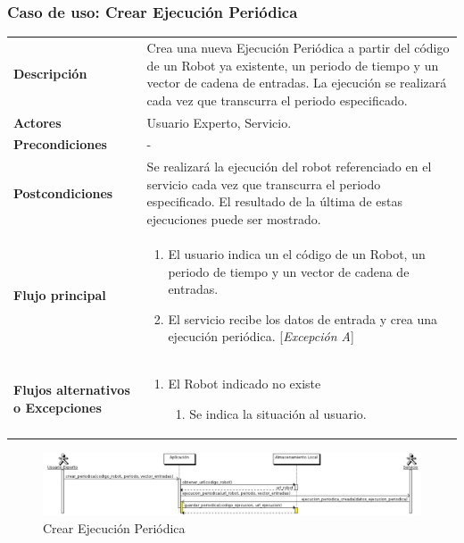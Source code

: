 \subsubsection{\large{Caso de uso: Crear Ejecución Periódica}}

\begin{tabular}[h]{ p{ } p{ }}

\textbf{Descripción} & Crea una nueva Ejecución Periódica a partir del
código de un Robot ya existente, un periodo de tiempo y un vector de
cadena de entradas.  La ejecución se realizará cada vez que transcurra
el periodo especificado.\\[3mm]

\textbf{Actores} & Usuario Experto, Servicio.\\[3mm]

\textbf{Precondiciones} & - \\[3mm]

\textbf{Postcondiciones} & Se realizará la ejecución del robot
referenciado en el servicio cada vez que transcurra el periodo
especificado. El resultado de la última de estas ejecuciones puede ser
mostrado. \\[3mm]

\textbf{Flujo principal} & \begin{enumerate}[leftmargin=1em,topsep=0pt, partopsep=0pt]
  \item El usuario indica un el código de un Robot, un periodo de
    tiempo y un vector de cadena de entradas.
  \item El servicio recibe los datos de entrada y crea una ejecución
    periódica. [\emph{Excepción A}]
\end{enumerate}\\[3mm]

\textbf{Flujos alternativos o Excepciones} &
\begin{enumerate}[label=\Alph*:,leftmargin=1em,topsep=0pt, partopsep=0pt]
\item El Robot indicado no existe
  \begin{enumerate}[label=\arabic*.,topsep=0pt, partopsep=0pt]
    \item Se indica la situación al usuario.
  \end{enumerate}
\end{enumerate}\\[3mm]
\end{tabular}

\begin{figure}[bp!]
  \includegraphics[width=1\textwidth]{chapters/technical-manual/diagrams/sequence/expert_user/crear_ejecucion_periodica.png}
\caption{Crear Ejecución Periódica}
\end{figure}
\clearpage
